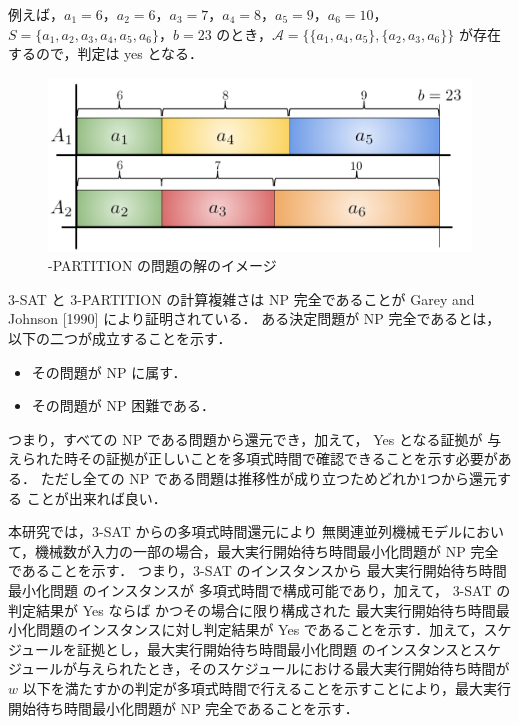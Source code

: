 \documentclass[12pt]{optlab-bachelor}
\begin{document}
例えば，$a_1 = 6$，$a_2 = 6$，$a_3 = 7$，$a_4 = 8$，$a_5 = 9$，$a_6 = 10$，$S = \{a_1, a_2, a_3, a_4, a_5, a_6\}$，$b = 23$ のとき，$\mathcal{A} = \big\{\{a_1, a_4, a_5\}, \{a_2, a_3, a_6\}\big\}$ が存在するので，判定は yes となる．

\begin{figure}[h]
  \centering
  \includegraphics[width = 12cm]{figure/3-PARTITION.pdf}
  \caption{{-PARTITION} の問題の解のイメージ}
\end{figure}

\textsc{3-SAT} と \textsc{3-PARTITION} の計算複雑さは NP 完全であることが Garey and Johnson [1990] \cite{3SAT} により証明されている．
ある決定問題が NP 完全であるとは，以下の二つが成立することを示す．
\begin{itemize}
  \item その問題が NP に属す．
  \item その問題が NP 困難である．
\end{itemize}
つまり，すべての NP である問題から還元でき，加えて， Yes となる証拠が
与えられた時その証拠が正しいことを多項式時間で確認できることを示す必要がある．
ただし全ての NP である問題は推移性が成り立つためどれか1つから還元する
ことが出来れば良い．

本研究では，\textsc{3-SAT} からの多項式時間還元により 無関連並列機械モデルにおいて，機械数が入力の一部の場合，最大実行開始待ち時間最小化問題が NP 完全であることを示す．
つまり，\textsc{3-SAT} のインスタンスから 最大実行開始待ち時間最小化問題 のインスタンスが
多項式時間で構成可能であり，加えて， \textsc{3-SAT}  の判定結果が Yes ならば
かつその場合に限り構成された  最大実行開始待ち時間最小化問題のインスタンスに対し判定結果が Yes であることを示す．加えて，スケジュールを証拠とし，最大実行開始待ち時間最小化問題 のインスタンスとスケジュールが与えられたとき，そのスケジュールにおける最大実行開始待ち時間が $w$ 以下を満たすかの判定が多項式時間で行えることを示すことにより，最大実行開始待ち時間最小化問題が NP 完全であることを示す．
\end{document}
